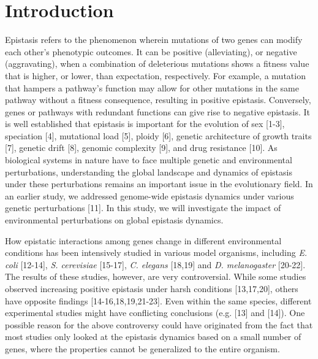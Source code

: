 \section{Introduction}

Epistasis refers to the phenomenon wherein mutations of two genes can
modify each other’s phenotypic outcomes. It can be positive
(alleviating), or negative (aggravating), when a combination of
deleterious mutations shows a fitness value that is higher, or lower,
than expectation, respectively. For example, a mutation that hampers a
pathway's function may allow for other mutations in the same pathway
without a fitness consequence, resulting in positive
epistasis. Conversely, genes or pathways with redundant functions can
give rise to negative epistasis. It is well established that epistasis
is important for the evolution of sex [1-3], speciation [4],
mutational load [5], ploidy [6], genetic architecture of growth traits
[7], genetic drift [8], genomic complexity [9], and drug resistance
[10]. As biological systems in nature have to face multiple genetic
and environmental perturbations, understanding the global landscape
and dynamics of epistasis under these perturbations remains an
important issue in the evolutionary field. In an earlier study, we
addressed genome-wide epistasis dynamics under various genetic
perturbations [11]. In this study, we will investigate the impact of
environmental perturbations on global epistasis dynamics.

How epistatic interactions among genes change in different
environmental conditions has been intensively studied in various model
organisms, including \textit{E. coli} [12-14], \textit{S. cerevisiae}
[15-17], \textit{C. elegans} [18,19] and \textit{D. melanogaster}
[20-22]. The results of these studies, however, are very
controversial. While some studies observed increasing positive
epistasis under harsh conditions [13,17,20], others have opposite
findings [14-16,18,19,21-23]. Even within the same species, different
experimental studies might have conflicting conclusions (e.g. [13] and
[14]). One possible reason for the above controversy could have
originated from the fact that most studies only looked at the
epistasis dynamics based on a small number of genes, where the
properties cannot be generalized to the entire organism.

